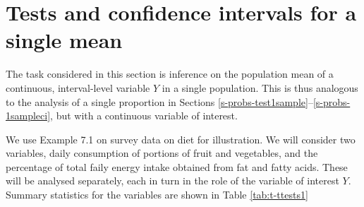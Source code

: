 \documentclass[11pt,a4paper,openany]{book}
\begin{document}
\section{Tests and confidence intervals for a single
mean}\label{s-means-1sample}

The task considered in this section is inference on the population mean
of a continuous, interval-level variable \(Y\) in a single population.
This is thus analogous to the analysis of a single proportion in
Sections \ref{s-probs-test1sample}--\ref{s-probs-1sampleci}, but with a
continuous variable of interest.

We use Example 7.1 on survey data on diet for illustration. We will
consider two variables, daily consumption of portions of fruit and
vegetables, and the percentage of total faily energy intake obtained
from fat and fatty acids. These will be analysed separately, each in
turn in the role of the variable of interest \(Y\). Summary statistics
for the variables are shown in Table \ref{tab:t-ttests1}
\end{document}
